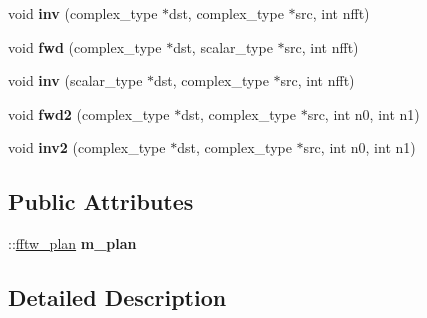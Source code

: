 \begin{DoxyCompactItemize}
\item 
\mbox{\label{struct_eigen_1_1internal_1_1fftw__plan_3_01double_01_4_a8bcceee3ae70cf398d7e00a07109a2e2}} 
void {\bfseries inv} (complex\+\_\+type $\ast$dst, complex\+\_\+type $\ast$src, int nfft)
\item 
\mbox{\label{struct_eigen_1_1internal_1_1fftw__plan_3_01double_01_4_aa5f91d54fad64fbe4f5b7d8969c77542}} 
void {\bfseries fwd} (complex\+\_\+type $\ast$dst, scalar\+\_\+type $\ast$src, int nfft)
\item 
\mbox{\label{struct_eigen_1_1internal_1_1fftw__plan_3_01double_01_4_a2c8abc28e2847bf0fd03f28be2273d86}} 
void {\bfseries inv} (scalar\+\_\+type $\ast$dst, complex\+\_\+type $\ast$src, int nfft)
\item 
\mbox{\label{struct_eigen_1_1internal_1_1fftw__plan_3_01double_01_4_ace4c5f1b0687b0e85fdc1ce9e188aaa3}} 
void {\bfseries fwd2} (complex\+\_\+type $\ast$dst, complex\+\_\+type $\ast$src, int n0, int n1)
\item 
\mbox{\label{struct_eigen_1_1internal_1_1fftw__plan_3_01double_01_4_a90bfe92a1e64201b30f2a9f1a075044e}} 
void {\bfseries inv2} (complex\+\_\+type $\ast$dst, complex\+\_\+type $\ast$src, int n0, int n1)
\end{DoxyCompactItemize}
\subsection*{Public Attributes}
\begin{DoxyCompactItemize}
\item 
\mbox{\label{struct_eigen_1_1internal_1_1fftw__plan_3_01double_01_4_ac8ea292bfb4e1b08fdf5c820002d6f22}} 
\+::\hyperlink{struct_eigen_1_1internal_1_1fftw__plan}{fftw\+\_\+plan} {\bfseries m\+\_\+plan}
\end{DoxyCompactItemize}


\subsection{Detailed Description}
